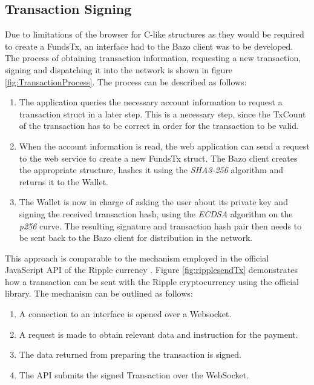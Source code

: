 \subsection{Transaction Signing}\label{transactionsigning}
Due to limitations of the browser for C-like structures as they would be required to create a FundsTx, an interface had to the Bazo client was to be developed. 
The process of obtaining transaction information, requesting a new transaction, signing and dispatching it into the network is shown in figure \ref{fig:TransactionProcess}. The process can be described as follows:
\begin{enumerate}
\item The application queries the necessary account information to request a transaction struct in a later step. This is a necessary step, since the TxCount of the transaction has to be correct in order for the transaction to be valid.
\item When the account information is read, the web application can send a request to the web service to create a new FundsTx struct. The Bazo client creates the appropriate structure, hashes it using the \textit{SHA3-256} algorithm and returns it to the Wallet.
\item The Wallet is now in charge of asking the user about its private key and signing the received transaction hash, using the \textit{ECDSA} algorithm on the \textit{p256} curve. The resulting signature and transaction hash pair then needs to be sent back to the Bazo client for distribution in the network.
\end{enumerate}

This approach is comparable to the mechanism employed in the official JavaScript API of the Ripple currency \cite{ripplelib}.
Figure \ref{fig:ripplesendTx} demonstrates how a transaction can be sent with the Ripple cryptocurrency using the official library. The mechanism can be outlined as follows:
\begin{enumerate}
\item A connection to an interface is opened over a Websocket. 
\item A request is made to obtain relevant data and instruction for the payment.
\item The data returned from preparing the transaction is signed.
\item The API submits the signed Transaction over the WebSocket.
\end{enumerate}


